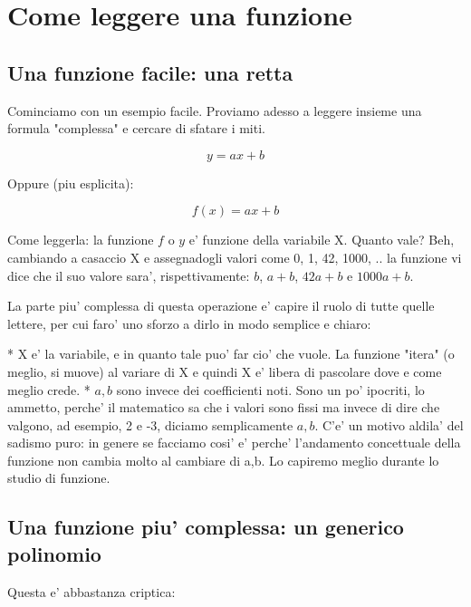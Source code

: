 \section{Come leggere una funzione}


\subsection{Una funzione facile: una retta}

Cominciamo con un esempio facile. Proviamo adesso a leggere insieme una formula "complessa" e cercare di sfatare i miti.

\begin{equation}
  y = a x + b 
\end{equation}

Oppure (piu esplicita): 

\begin{equation}
  f(x) = a x + b 
\end{equation}

Come leggerla: la funzione $f$ o $y$ e' funzione della variabile X. Quanto vale? Beh, cambiando a casaccio X e assegnadogli valori
come 0, 1, 42, 1000, .. la funzione vi dice che il suo valore sara', rispettivamente: $b$, $a+b$, $42a+b$ e $1000a+b$.

La parte piu' complessa di questa operazione e' capire il ruolo di tutte quelle lettere, per cui faro' uno sforzo a dirlo in modo semplice e chiaro:

* X e' la variabile, e in quanto tale puo' far cio' che vuole. La funzione "itera" 
  (o meglio, si muove) al variare di X e quindi X e' libera di pascolare dove e come meglio crede.
* $a,b$ sono invece dei coefficienti noti. Sono un po' ipocriti, lo ammetto, perche' il matematico sa che i valori sono fissi
  ma invece di dire che valgono, ad esempio, 2 e -3, diciamo semplicamente $a,b$. C'e' un motivo aldila' del sadismo puro:
  in genere se facciamo cosi' e' perche' l'andamento concettuale della funzione non cambia molto al cambiare di a,b. Lo capiremo
  meglio durante lo studio di funzione.

\subsection{Una funzione piu' complessa: un generico polinomio}

Questa e' abbastanza criptica:


